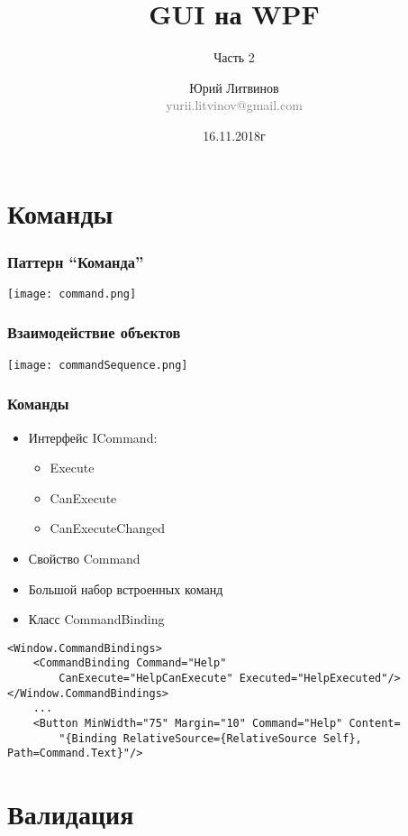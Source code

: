 \documentclass[xetex,mathserif,serif]{beamer}
\title{GUI на WPF}
\subtitle{Часть 2}
\author[Юрий Литвинов]{Юрий Литвинов\\\small{\textcolor{gray}{yurii.litvinov@gmail.com}}}
\date{16.11.2018г}
\begin{document}
	\frame{\titlepage}

	\section{Команды}

	\begin{frame}
		\frametitle{Паттерн ``Команда''}
		\begin{center}
			\texttt{[image: command.png]}
		\end{center}
	\end{frame}

	\begin{frame}
		\frametitle{Взаимодействие объектов}
		\begin{center}
			\texttt{[image: commandSequence.png]}
		\end{center}
	\end{frame}

	\begin{frame}[fragile]
		\frametitle{Команды}
		\begin{itemize}
			\item Интерфейс ICommand:
			\begin{itemize}
				\item Execute
				\item CanExecute
				\item CanExecuteChanged
			\end{itemize}
			\item Свойство Command
			\item Большой набор встроенных команд
			\item Класс CommandBinding
		\end{itemize}
		\begin{small}
			\begin{verbatim}
<Window.CommandBindings>
    <CommandBinding Command="Help"
        CanExecute="HelpCanExecute" Executed="HelpExecuted"/>
</Window.CommandBindings>
    ...
    <Button MinWidth="75" Margin="10" Command="Help" Content=
        "{Binding RelativeSource={RelativeSource Self}, Path=Command.Text}"/>
			\end{verbatim}
		\end{small}
	\end{frame}

	\section{Валидация}
\end{document}
